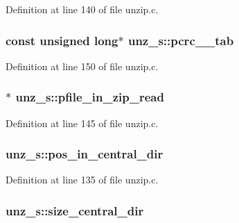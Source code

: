 Definition at line 140 of file unzip.\-c.

\hypertarget{structunz__s_a9efa28355c0dec769d07c5a52d70605d}{
\subsubsection[{pcrc\-\_\-32\-\_\-tab}]{\setlength{\rightskip}{0pt plus 5cm}const unsigned {\bf long}$\ast$ unz\-\_\-s\-::pcrc\-\_\-\_\-tab}}\label{structunz__s_a9efa28355c0dec769d07c5a52d70605d}


Definition at line 150 of file unzip.\-c.

\hypertarget{structunz__s_a7a5f0568475ad9a36ee2c1f3972406f0}{
\subsubsection[{pfile\-\_\-in\-\_\-zip\-\_\-read}]{$\ast$ unz\-\_\-s\-::pfile\-\_\-in\-\_\-zip\-\_\-read}}\label{structunz__s_a7a5f0568475ad9a36ee2c1f3972406f0}


Definition at line 145 of file unzip.\-c.

\hypertarget{structunz__s_a70f2901a7ba85573aa280bad826baf4a}{
\subsubsection[{pos\-\_\-in\-\_\-central\-\_\-dir}]{ unz\-\_\-s\-::pos\-\_\-in\-\_\-central\-\_\-dir}}\label{structunz__s_a70f2901a7ba85573aa280bad826baf4a}


Definition at line 135 of file unzip.\-c.

\hypertarget{structunz__s_a60b803a02e17ae46755cb94026ae973a}{
\subsubsection[{size\-\_\-central\-\_\-dir}]{ unz\-\_\-s\-::size\-\_\-central\-\_\-dir}}\label{structunz__s_a60b803a02e17ae46755cb94026ae973a}



